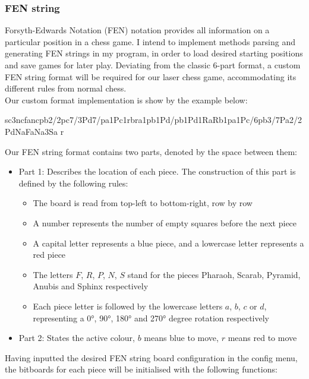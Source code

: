 \documentclass[../main/main.tex]{subfiles}
\begin{document}
\subsubsection*{FEN string}
Forsyth-Edwards Notation (FEN) notation provides all information on a particular position in a chess game. I intend to implement methods parsing and generating FEN strings in my program, in order to load desired starting positions and save games for later play. Deviating from the classic 6-part format, a custom FEN string format will be required for our laser chess game, accommodating its different rules from normal chess.
\\
Our custom format implementation is show by the example below:

\begin{center}
sc3ncfancpb2/2pc7/3Pd7/pa1Pc1rbra1pb1Pd/pb1Pd1RaRb1pa1Pc/6pb3/7Pa2/2PdNaFaNa3Sa r
\end{center}

\noindent Our FEN string format contains two parts, denoted by the space between them:

\begin{itemize}
\item Part 1: Describes the location of each piece. The construction of this part is defined by the following rules:
\begin{itemize}
\item The board is read from top-left to bottom-right, row by row
\item A number represents the number of empty squares before the next piece
\item A capital letter represents a blue piece, and a lowercase letter represents a red piece
\item The letters $F$, $R$, $P$, $N$, $S$ stand for the pieces Pharaoh, Scarab, Pyramid, Anubis and Sphinx respectively
\item Each piece letter is followed by the lowercase letters $a$, $b$, $c$ or $d$, representing a 0°, 90°, 180° and 270° degree rotation respectively
\end{itemize}
\item Part 2: States the active colour, $b$ means blue to move, $r$ means red to move
\end{itemize}

Having inputted the desired FEN string board configuration in the config menu, the bitboards for each piece will be initialised with the following functions:
\end{document}
